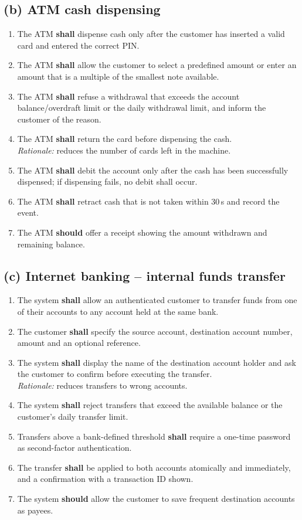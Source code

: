 \documentclass[11pt,a4paper]{article}
\begin{document}
\subsection*{(b) ATM cash dispensing}
\begin{enumerate}[label=ATM-\arabic*,leftmargin=*]
  \item The ATM \textbf{shall} dispense cash only after the customer has inserted a valid card and entered the correct PIN.
  \item The ATM \textbf{shall} allow the customer to select a predefined amount or enter an amount that is a multiple of the smallest note available.
  \item The ATM \textbf{shall} refuse a withdrawal that exceeds the account balance/overdraft limit or the daily withdrawal limit, and inform the customer of the reason.
  \item The ATM \textbf{shall} return the card before dispensing the cash.\\
  \textit{Rationale:} reduces the number of cards left in the machine.
  \item The ATM \textbf{shall} debit the account only after the cash has been successfully dispensed; if dispensing fails, no debit shall occur.
  \item The ATM \textbf{shall} retract cash that is not taken within 30\,s and record the event.
  \item The ATM \textbf{should} offer a receipt showing the amount withdrawn and remaining balance.
\end{enumerate}

\subsection*{(c) Internet banking -- internal funds transfer}
\begin{enumerate}[label=TRF-\arabic*,leftmargin=*]
  \item The system \textbf{shall} allow an authenticated customer to transfer funds from one of their accounts to any account held at the same bank.
  \item The customer \textbf{shall} specify the source account, destination account number, amount and an optional reference.
  \item The system \textbf{shall} display the name of the destination account holder and ask the customer to confirm before executing the transfer.\\
  \textit{Rationale:} reduces transfers to wrong accounts.
  \item The system \textbf{shall} reject transfers that exceed the available balance or the customer's daily transfer limit.
  \item Transfers above a bank-defined threshold \textbf{shall} require a one-time password as second-factor authentication.
  \item The transfer \textbf{shall} be applied to both accounts atomically and immediately, and a confirmation with a transaction ID shown.
  \item The system \textbf{should} allow the customer to save frequent destination accounts as payees.
\end{enumerate}
\end{document}
